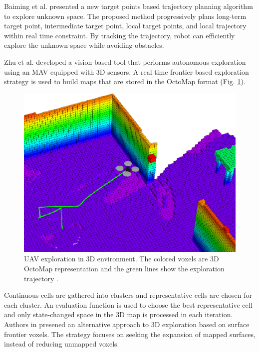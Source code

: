 Baiming et al. \cite{Baiming2018} presented a new target points based trajectory planning algorithm to explore unknown space. The proposed method progressively plans long-term target point, intermediate target point, local target points,
and local trajectory within real time constraint. By tracking the trajectory, robot can efficiently explore the unknown space while avoiding obstacles.

Zhu et al. \cite{Zhu2015} developed a vision-based tool that performs autonomous exploration using an MAV equipped with 3D sensors. A real time frontier based exploration strategy is used to build maps that are stored in the OctoMap format (Fig. \ref{fig:octomap}).

\begin{figure}[t!]
	\centering
	\includegraphics[width=1.0\columnwidth]{./pictures/octomap_and_drone.png}	
	\caption{UAV exploration in 3D environment. The colored voxels are 3D OctoMap representation and the green lines show the exploration trajectory \cite{Wang2019}.}
	\label{fig:octomap}
\end{figure}

Continuous cells are gathered into clusters and representative cells are chosen for each cluster. An evaluation function is used to choose the best representative cell and only state-changed space in the 3D map is processed in each iteration.
Authors in \cite{Senarathne2016} presened an alternative approach to 3D
exploration based on surface frontier voxels. The strategy focuses on seeking the expansion of mapped surfaces, instead of reducing unmapped voxels. 

